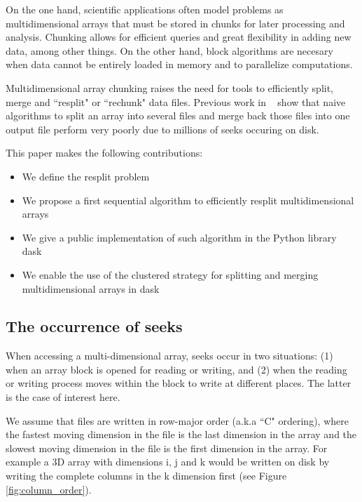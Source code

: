 \documentclass[conference]{IEEEtran}
\begin{document}
On the one hand, scientific applications often model problems as
multidimensional arrays that must be stored in chunks for later processing and analysis.
Chunking allows for efficient queries and great flexibility in adding new data, among other things.
On the other hand, block algorithms are necesary when data cannot be entirely
loaded in memory and to parallelize computations.

Multidimensional array chunking raises the need for tools to efficiently split,
merge and ``resplit" or ``rechunk" data files. Previous work in ~\cite{seqalgorithms}
show that naive algorithms to split an array into several files and merge back those
files into one output file perform very poorly due to millions of seeks occuring on disk.

This paper makes the following contributions:
\begin{itemize}
  \item We define the resplit problem
  \item We propose a first sequential algorithm to efficiently resplit multidimensional arrays
  \item We give a public implementation of such algorithm in the Python library dask
  \item We enable the use of the clustered strategy for splitting and merging multidimensional arrays in dask
\end{itemize}

\subsection{The occurrence of seeks}
When accessing a multi-dimensional array, seeks occur in two situations:
(1) when an array block is opened for reading or writing, and (2) when the
reading or writing process moves within the block to write at different
places. The latter is the case of interest here.

We assume that files are written in row-major order (a.k.a ``C" ordering),
where the fastest moving dimension in the file is the last dimension in the
array and the slowest moving dimension in the file is the first dimension
in the array. For example a 3D array with dimensions i, j and k would be
written on disk by writing the complete columns in the k dimension first
(see Figure \ref{fig:column_order}).
\end{document}
